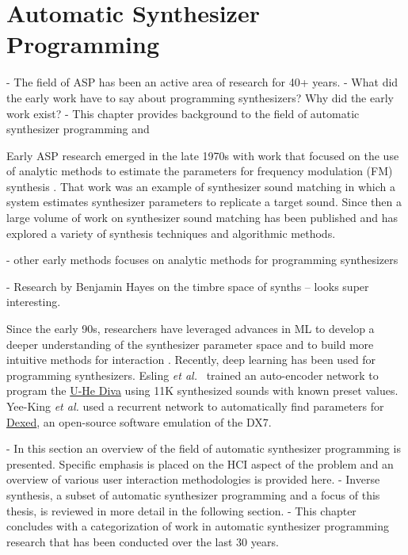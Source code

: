 \chapter{Automatic Synthesizer Programming}
\label{chapter:asp-background}



- The field of ASP has been an active area of research for 40+ years.
- What did the early work have to say about programming synthesizers? Why did the early work exist?
- This chapter provides background to the field of automatic synthesizer programming and 

Early ASP research emerged in the late 1970s with work that focused on the use of analytic methods to estimate the parameters for frequency modulation (FM) synthesis \cite{justice1979analytic}. That work was an example of synthesizer sound matching in which a system estimates synthesizer parameters to replicate a target sound. Since then a large volume of work on synthesizer sound matching has been published and has explored a variety of synthesis techniques and algorithmic methods.

- other early methods focuses on analytic methods for programming synthesizers \cite{beauchamp1982synthesis, payne1987microcomputer, delprat1990parameter}

- Research by Benjamin Hayes on the timbre space of synths -- looks super interesting.

Since the early 90s, researchers have leveraged advances in ML to develop a deeper understanding of the synthesizer parameter space and to build more intuitive methods for interaction \cite{horner1993machine}. Recently, deep learning has been used for programming synthesizers.  Esling {\em et al.}\ \cite{esling2020flow} trained an auto-encoder network to program the \href{https://u-he.com/products/diva/}{U-He Diva} using 11K synthesized sounds with known preset values. Yee-King {\em et al.} \cite{yee2018automatic} used a recurrent network to automatically find parameters for \href{https://asb2m10.github.io/dexed/}{Dexed}, an open-source software emulation of the DX7.

- In this section an overview of the field of automatic synthesizer programming is presented. Specific emphasis is placed on the HCI aspect of the problem and an overview of various user interaction methodologies is provided here.
- Inverse synthesis, a subset of automatic synthesizer programming and a focus of this thesis, is reviewed in more detail in the following section.
- This chapter concludes with a categorization of work in automatic synthesizer programming research that has been conducted over the last 30 years.

